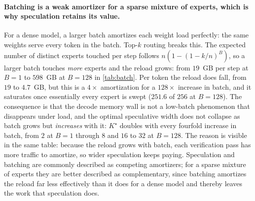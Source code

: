 \paragraph{Batching is a weak amortizer for a sparse mixture of experts, which
is why speculation retains its value.}
For a dense model, a larger batch amortizes each weight load perfectly: the same
weights serve every token in the batch. Top-$k$ routing breaks this. The
expected number of distinct experts touched per step follows
$n(1 - (1 - k/n)^B)$, so a larger batch touches \emph{more} experts and the
reload grows: from $19$~GB per step at $B=1$ to $598$~GB at $B=128$ in
\cref{tab:batch}. Per token the reload does fall, from $19$ to $4.7$~GB, but
this is a $4\times$ amortization for a $128\times$ increase in batch, and it
saturates once essentially every expert is swept ($251.6$ of $256$ at $B=128$).
The consequence is that the decode memory wall is not a low-batch phenomenon
that disappears under load, and the optimal speculative width does not
collapse as batch grows but \emph{increases} with it: $K^\star$ doubles with
every fourfold increase in batch, from $2$ at $B=1$ through $8$ and $16$ to
$32$ at $B=128$. The reason is visible in the same table: because the reload
grows with batch, each verification pass has more traffic to amortize, so wider
speculation keeps paying. Speculation and batching are commonly described as
competing amortizers; for a sparse mixture of experts they are better described
as complementary, since batching amortizes the reload far less effectively than
it does for a dense model and thereby leaves the work that speculation does.

